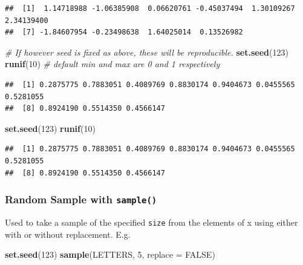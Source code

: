 \documentclass[
]{book}
\newenvironment{Shaded}{\begin{snugshade}}{\end{snugshade}}
\newcommand{\AttributeTok}[1]{\textcolor[rgb]{0.13,0.29,0.53}{#1}}
\newcommand{\CommentTok}[1]{\textcolor[rgb]{0.56,0.35,0.01}{\textit{#1}}}
\newcommand{\ConstantTok}[1]{\textcolor[rgb]{0.56,0.35,0.01}{#1}}
\newcommand{\DecValTok}[1]{\textcolor[rgb]{0.00,0.00,0.81}{#1}}
\newcommand{\FunctionTok}[1]{\textcolor[rgb]{0.13,0.29,0.53}{\textbf{#1}}}
\newcommand{\NormalTok}[1]{#1}
\begin{document}
\begin{verbatim}
##  [1]  1.14718988 -1.06385908  0.06620761 -0.45037494  1.30109267  2.34139400
##  [7] -1.84607954 -0.23498638  1.64025014  0.13526982
\end{verbatim}

\begin{Shaded}
\begin{Highlighting}[]
\CommentTok{\# If however seed is fixed as above, these will be reproducible.}
\FunctionTok{set.seed}\NormalTok{(}\DecValTok{123}\NormalTok{)}
\FunctionTok{runif}\NormalTok{(}\DecValTok{10}\NormalTok{) }\CommentTok{\# default min and max are 0 and 1 respectively}
\end{Highlighting}
\end{Shaded}

\begin{verbatim}
##  [1] 0.2875775 0.7883051 0.4089769 0.8830174 0.9404673 0.0455565 0.5281055
##  [8] 0.8924190 0.5514350 0.4566147
\end{verbatim}

\begin{Shaded}
\begin{Highlighting}[]
\FunctionTok{set.seed}\NormalTok{(}\DecValTok{123}\NormalTok{)}
\FunctionTok{runif}\NormalTok{(}\DecValTok{10}\NormalTok{)}
\end{Highlighting}
\end{Shaded}

\begin{verbatim}
##  [1] 0.2875775 0.7883051 0.4089769 0.8830174 0.9404673 0.0455565 0.5281055
##  [8] 0.8924190 0.5514350 0.4566147
\end{verbatim}

\hypertarget{random-sample-with-sample}{%
\subsubsection*{\texorpdfstring{Random Sample with \texttt{sample()}}{Random Sample with sample()}}\label{random-sample-with-sample}}

Used to take a sample of the specified \texttt{size} from the elements of x using either with or without replacement. E.g.

\begin{Shaded}
\begin{Highlighting}[]
\FunctionTok{set.seed}\NormalTok{(}\DecValTok{123}\NormalTok{)}
\FunctionTok{sample}\NormalTok{(LETTERS, }\DecValTok{5}\NormalTok{, }\AttributeTok{replace =} \ConstantTok{FALSE}\NormalTok{)}
\end{Highlighting}
\end{Shaded}
\end{document}
